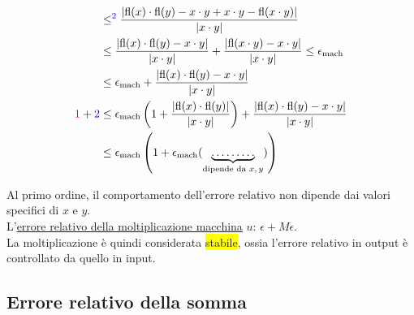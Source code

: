 \documentclass{article}
\begin{document}
\begin{align*}
                                                & \le^{\textcolor{blue}{2}}\frac{\left|\operatorname{fl}(x)\cdot\operatorname{fl}(y)-x\cdot y+x\cdot y-\operatorname{fl}(x\cdot y)\right|}{\left|x\cdot y\right|}                                                                                                                                                                                          \\
                                                & \le\frac{\left|\operatorname{fl}(x)\cdot\operatorname{fl}(y)-x\cdot y\right|}{\left|x\cdot y\right|}+\frac{\left|\operatorname{fl}(x\cdot y)-x\cdot y\right|}{\left|x\cdot y\right|}\le \epsilon_{\mathrm{mach}}                                                                                                                                         \\
                                                & \le\epsilon_{\mathrm{mach}}+\frac{\left|\operatorname{fl}(x)\cdot\operatorname{fl}(y)-x\cdot y\right|}{\left|x\cdot y\right|}                                                                                                                                                                                                                            \\
    \textcolor{red}{1}+\textcolor{blue}{2}      & \le\epsilon_{\mathrm{mach}}\left(1+\frac{\left|\operatorname{fl}(x)\cdot\operatorname{fl}(y)\right|}{\left|x\cdot y\right|}\right)+\frac{\left|\operatorname{fl}(x)\cdot\operatorname{fl}(y)-x\cdot y\right|}{\left|x\cdot y\right|}                                                                                                                     \\
                                                & \le\epsilon_{\mathrm{mach}}\left(1+\epsilon_{\mathrm{mach}}(\underbrace{\dots\dots\dots}_{\text{dipende da $x,y$}})\right)
\end{align*}

Al primo ordine, il comportamento dell'errore relativo non dipende dai valori specifici di $x$ e $y$.\\
L'\underline{errore relativo della moltiplicazione macchina} $u$: $\epsilon+M\epsilon$.\\
La moltiplicazione è quindi considerata \colorbox{yellow}{stabile}, ossia l'errore relativo in output è controllato da quello in input.

\subsection{Errore relativo della somma}
\end{document}
